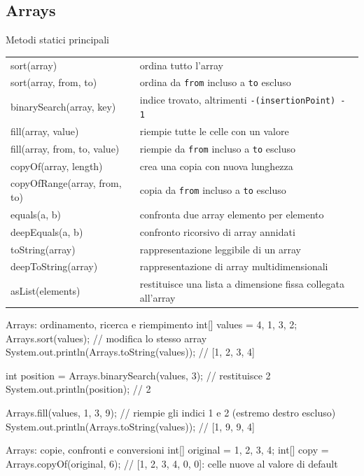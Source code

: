 ﻿\documentclass[10pt,a4paper]{article}
\newcommand{\cmd}[1]{\texttt{#1}}
\newcommand{\topicsubsection}[1]{\Needspace{10\baselineskip}\subsection{#1}}
\newenvironment{topicblock}{%
  \par\medskip\noindent\begin{minipage}{\textwidth}%
}{%
  \end{minipage}\par\medskip%
}
\begin{document}
\begin{topicblock}
\topicsubsection{Arrays}
\begin{concept}{Metodi statici principali}
\renewcommand{\arraystretch}{1.15}
\begin{tabularx}{\textwidth}{>{\ttfamily\small}p{5.5cm} X}
sort(array) & ordina tutto l'array \\
sort(array, from, to) & ordina da \cmd{from} incluso a \cmd{to} escluso \\
binarySearch(array, key) & indice trovato, altrimenti \cmd{-(insertionPoint) - 1} \\
fill(array, value) & riempie tutte le celle con un valore \\
fill(array, from, to, value) & riempie da \cmd{from} incluso a \cmd{to} escluso \\
copyOf(array, length) & crea una copia con nuova lunghezza \\
copyOfRange(array, from, to) & copia da \cmd{from} incluso a \cmd{to} escluso \\
equals(a, b) & confronta due array elemento per elemento \\
deepEquals(a, b) & confronto ricorsivo di array annidati \\
toString(array) & rappresentazione leggibile di un array \\
deepToString(array) & rappresentazione di array multidimensionali \\
asList(elements) & restituisce una lista a dimensione fissa collegata all'array \\
\end{tabularx}
\end{concept}

\begin{codebox}{Arrays: ordinamento, ricerca e riempimento}
int[] values = {4, 1, 3, 2};
Arrays.sort(values); // modifica lo stesso array
System.out.println(Arrays.toString(values)); // [1, 2, 3, 4]

int position = Arrays.binarySearch(values, 3); // restituisce 2
System.out.println(position); // 2

Arrays.fill(values, 1, 3, 9); // riempie gli indici 1 e 2 (estremo destro escluso)
System.out.println(Arrays.toString(values)); // [1, 9, 9, 4]
\end{codebox}

\begin{codebox}{Arrays: copie, confronti e conversioni}
int[] original = {1, 2, 3, 4};
int[] copy = Arrays.copyOf(original, 6);
// [1, 2, 3, 4, 0, 0]: celle nuove al valore di default


\end{codebox}
\end{topicblock}
\end{document}
